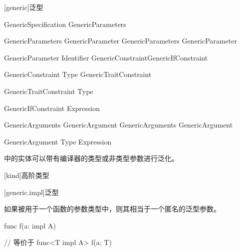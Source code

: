 
[generic]{泛型}

\begin{bnf}{GenericSpecification}
    \terminal{<} GenericParameters \terminal{>}
\end{bnf}

\begin{bnf}{GenericParameters}
    GenericParameter \br
    GenericParameters \terminal{,} GenericParameter
\end{bnf}

\begin{bnf}{GenericParameter}
    Identifier \bnfq GenericConstraint\bnfq GenericIfConstraint\bnfq
\end{bnf}

\begin{bnf}{GenericConstraint}
    \terminal{:}  \br
    \terminal{:} Type \br
    GenericTraitConstraint
\end{bnf}

\begin{bnf}{GenericTraitConstraint}
     Type
\end{bnf}

\begin{bnf}{GenericIfConstraint}
     Expression
\end{bnf}

\begin{bnf}{GenericArguments}
    GenericArgument \br
    GenericArguments \terminal{,} GenericArgument
\end{bnf}

\begin{bnf}{GenericArgument}
    Type \br
    Expression
\end{bnf}

\pnum
\X 中的实体可以带有编译器的类型或非类型参数进行泛化。

[kind]{高阶类型}

[generic.impl]{泛型}

\pnum
如果被用于一个函数的参数类型中，则其相当于一个匿名的泛型参数。

\enterexample
\begin{codeblock}

func f(a: impl A) { }

// 等价于
func<T impl A> f(a: T) { }

\end{codeblock}
\exitexample
